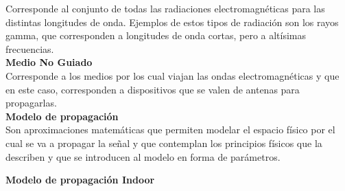 Corresponde al conjunto de todas las radiaciones electromagnéticas para las distintas longitudes de onda. Ejemplos de estos tipos de radiación son los rayos gamma, que corresponden a longitudes de onda cortas, pero a altísimas frecuencias.\\

\textbf{Medio No Guiado}\\

Corresponde a los medios por los cual viajan las ondas electromagnéticas y que en este caso, corresponden a dispositivos que se valen de antenas para propagarlas.\\

\textbf{Modelo de propagación}\\

Son aproximaciones matemáticas que permiten modelar el espacio físico por el cual se va a propagar la señal y que contemplan los principios físicos que la describen y que se introducen al modelo en forma de parámetros.

\textbf{Modelo de propagación Indoor}


